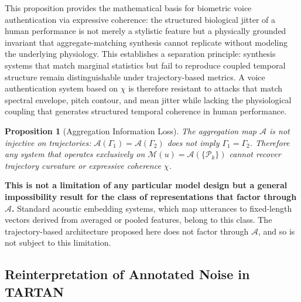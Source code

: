 \documentclass[12pt, a4paper]{article}
\newcommand{\hyperemph}[1]{\textbf{\large #1}}
\newtheorem{proposition}{Proposition}
\begin{document}
This proposition provides the mathematical basis for biometric voice authentication via expressive coherence: the structured biological jitter of a human performance is not merely a stylistic feature but a physically grounded invariant that aggregate-matching synthesis cannot replicate without modeling the underlying physiology. This establishes a separation principle: synthesis systems that match marginal statistics but fail to reproduce coupled temporal structure remain distinguishable under trajectory-based metrics. A voice authentication system based on $\chi$ is therefore resistant to attacks that match spectral envelope, pitch contour, and mean jitter while lacking the physiological coupling that generates structured temporal coherence in human performance.

\begin{proposition}[Aggregation Information Loss]
The aggregation map $\mathcal{A}$ is not injective on trajectories: $\mathcal{A}(\Gamma_1) = \mathcal{A}(\Gamma_2)$ does not imply $\Gamma_1 = \Gamma_2$. Therefore any system that operates exclusively on $\mathcal{M}(u) = \mathcal{A}(\{\mathcal{P}_k\})$ cannot recover trajectory curvature or expressive coherence $\chi$.
\end{proposition}

\hyperemph{This is not a limitation of any particular model design but a general impossibility result for the class of representations that factor through $\mathcal{A}$.} Standard acoustic embedding systems, which map utterances to fixed-length vectors derived from averaged or pooled features, belong to this class. The trajectory-based architecture proposed here does not factor through $\mathcal{A}$, and so is not subject to this limitation.

\subsection{Reinterpretation of Annotated Noise in TARTAN}
\end{document}
